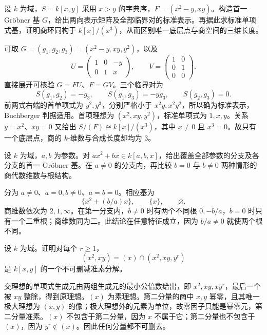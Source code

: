 \begin{exercise}\label{b3:ex:B-complete-certificate}
	设 \(k\) 为域，\(S=k[x,y]\) 采用 \(x>y\) 的字典序，\(F=(x^2-y,xy)\)。构造首一 Gröbner 基 \(G\)，给出两向表示矩阵及全部临界对的标准表示。再据此求标准单项式基，证明商环同构于 \(k[x]/(x^3)\)，从而区别唯一底层点与商空间的三维长度。
\end{exercise}
\begin{solution}
	可取 \(G=(g_1,g_2,g_3)=(x^2-y,xy,y^2)\)，以及
	\[
		U=\begin{pmatrix}1&0&-y\\0&1&x\end{pmatrix},\qquad
		V=\begin{pmatrix}1&0\\0&1\\0&0\end{pmatrix}.
	\]
	直接展开可核验 \(G=FU\)、\(F=GV\)。三个临界对为
	\[
		S(g_1,g_2)=-g_3,\qquad S(g_1,g_3)=-yg_3,\qquad S(g_2,g_3)=0.
	\]
	前两式右端的首单项式为 \(y^2,y^3\)，分别严格小于 \(x^2y,x^2y^2\)，所以确为标准表示，Buchberger 判据适用。首项理想为 \((x^2,xy,y^2)\)，标准单项式为 \(1,x,y\)。关系 \(y=x^2\)、\(xy=0\) 又给出 \(S/(F)\cong k[x]/(x^3)\)，其中 \(x\ne0\) 且 \(x^3=0\)。故只有一个底层点，商的 \(k\)-维数与合成长度却均为 \(3\)。
\end{solution}

\begin{exercise}\label{b3:ex:B-parameter}
	设 \(k\) 为域，\(a,b\) 为参数。对 \(a x^2+b x\in k[a,b,x]\)，给出覆盖全部参数的分支及各分支的首一 Gröbner 基。在 \(a\ne0\) 的分支内，再比较 \(b=0\) 与 \(b\ne0\) 两种情形的商代数维数与根结构。
\end{exercise}
\begin{solution}
	分为 \(a\ne0\)、\(a=0,b\ne0\)、\(a=b=0\)。相应基为
	\[
		\{x^2+(b/a)x\},\qquad \{x\},\qquad\varnothing.
	\]
	商维数依次为 \(2,1,\infty\)。在第一分支内，\(b\ne0\) 时有两个不同根 \(0,-b/a\)，\(b=0\) 时只有一个二重根；商维数同为二。此结论在任意特征成立，因为 \(b/a\ne0\) 就使两个根不同。
\end{solution}

\begin{exercise}\label{b3:ex:B-primary-components}
	设 \(k\) 为域。证明对每个 \(r\ge1\)，
	\[
		(x^2,xy)=(x)\cap(x^2,xy,y^r)
	\]
	是 \(k[x,y]\) 的一个不可删减准素分解。
\end{exercise}
\begin{solution}
	交理想的单项式生成元由两组生成元的最小公倍数给出，即 \(x^2,xy,xy^r\)，最后一个被 \(xy\) 整除，得到原理想。\((x)\) 为素理想。第二分量的商中 \(x,y\) 幂零，且其唯一极大理想为 \((x,y)\) 的像；极大理想外的元素为单位，故零因子只能是幂零元，第二分量准素。\((x)\) 不包含于第二分量，因为 \(x\) 不属于它；第二分量也不包含于 \((x)\)，因为 \(y^r\notin(x)\)。因此任何分量都不可删去。
\end{solution}

